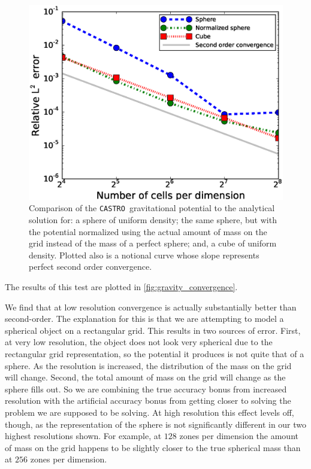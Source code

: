 \documentclass[iop,numberedappendix]{../emulateapj}
\newcommand{\castro}{\texttt{CASTRO}}
\begin{document}
\begin{figure}[h]
  \centering
  \includegraphics[scale=0.45]{plots/phi_comparison}
  \caption{Comparison of the \castro\ gravitational potential to the analytical solution for: 
    a sphere of uniform density; the same sphere, but with the potential normalized using the 
    actual amount of mass on the grid instead of the mass of a perfect sphere; and, a 
    cube of uniform density. Plotted also is a notional curve whose slope represents
    perfect second order convergence.\label{fig:gravity_convergence}}
\end{figure}
The results of this test are plotted in \autoref{fig:gravity_convergence}. 

We find that at low resolution convergence is actually substantially better 
than second-order. The explanation for this is that we are attempting to 
model a spherical object on a rectangular grid. This results in two sources of error.
First, at very low resolution, the object does not look very spherical due to the rectangular 
grid representation, so the potential it produces is not quite that of a sphere. 
As the resolution is increased, the distribution of the mass on the grid will change.
Second, the total amount of mass on the grid will change as the sphere fills out. 
So we are combining the true accuracy bonus from increased resolution 
with the artificial accuracy bonus from getting closer to solving the problem 
we are supposed to be solving. At high resolution this effect levels off, though, 
as the representation of the sphere is not significantly different in 
our two highest resolutions shown. For example, at $128$ zones per dimension 
the amount of mass on the grid happens to be slightly closer to the true spherical 
mass than at $256$ zones per dimension.
\end{document}
